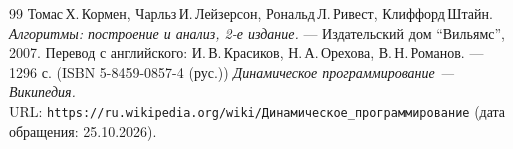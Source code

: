 \begin{thebibliography}{99}
Томас\,Х.\,Кормен, Чарльз\,И.\,Лейзерсон, Рональд\,Л.\,Ривест, Клиффорд\,Штайн.
{\itshape Алгоритмы: построение и анализ, 2-е издание.} --- Издательский дом \enquote{Вильямс}, 2007. Перевод с английского: И.\,В.\,Красиков, Н.\,А.\,Орехова, В.\,Н.\,Романов. --- 1296 с. (ISBN 5-8459-0857-4 (рус.))
{\itshape Динамическое программирование --- Википедия.} \\URL: \texttt{https://ru.wikipedia.org/wiki/Динамическое\_программирование} (дата обращения: 25.10.2026).
\end{thebibliography}
\pagebreak